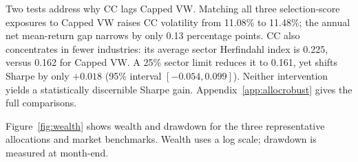 \documentclass[letterpaper,journal]{IEEEtran}
\begin{document}
Two tests address why CC lags Capped VW. Matching all three selection-score exposures to Capped VW raises CC volatility from 11.08\% to 11.48\%; the annual net mean-return gap narrows by only 0.13 percentage points. CC also concentrates in fewer industries: its average sector Herfindahl index is 0.225, versus 0.162 for Capped VW. A 25\% sector limit reduces it to 0.161, yet shifts Sharpe by only $+0.018$ (95\% interval $[-0.054,0.099]$). Neither intervention yields a statistically discernible Sharpe gain. Appendix~\ref{app:allocrobust} gives the full comparisons.

Figure~\ref{fig:wealth} shows wealth and drawdown for the three representative allocations and market benchmarks. Wealth uses a log scale; drawdown is measured at month-end.

\end{document}
